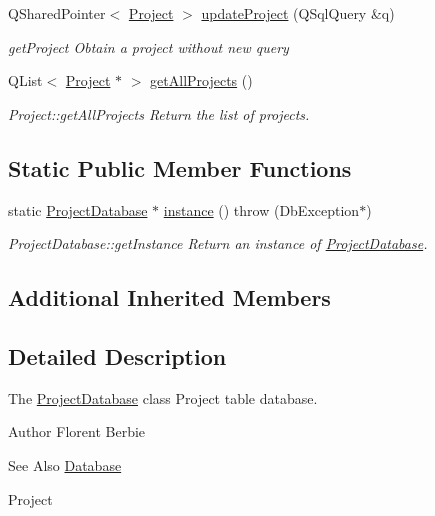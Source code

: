 \begin{DoxyCompactItemize}
Q\-Shared\-Pointer$<$ \hyperlink{classModels_1_1Project}{Project} $>$ \hyperlink{classDatabases_1_1ProjectDatabase_ab644aeb47d9666e8191cc9bc6ab93417}{update\-Project} (Q\-Sql\-Query \&q)
\begin{DoxyCompactList}\small\item\em get\-Project Obtain a project without new query \end{DoxyCompactList}\item 
Q\-List$<$ \hyperlink{classModels_1_1Project}{Project} $\ast$ $>$ \hyperlink{classDatabases_1_1ProjectDatabase_ac2532676aabcc8f304b2a3ddf4892205}{get\-All\-Projects} ()
\begin{DoxyCompactList}\small\item\em Project\-::get\-All\-Projects Return the list of projects. \end{DoxyCompactList}\end{DoxyCompactItemize}
\subsection*{Static Public Member Functions}
\begin{DoxyCompactItemize}
\item 
static \hyperlink{classDatabases_1_1ProjectDatabase}{Project\-Database} $\ast$ \hyperlink{classDatabases_1_1ProjectDatabase_a75cf81b8d073addcf43a313483dafe65}{instance} ()  throw (\-Db\-Exception$\ast$)
\begin{DoxyCompactList}\small\item\em Project\-Database\-::get\-Instance Return an instance of \hyperlink{classDatabases_1_1ProjectDatabase}{Project\-Database}. \end{DoxyCompactList}\end{DoxyCompactItemize}
\subsection*{Additional Inherited Members}


\subsection{Detailed Description}
The \hyperlink{classDatabases_1_1ProjectDatabase}{Project\-Database} class Project table database. 

\begin{DoxyAuthor}{Author}
Florent Berbie 
\end{DoxyAuthor}
\begin{DoxySeeAlso}{See Also}
\hyperlink{classDatabases_1_1Database}{Database} 

Project 
\end{DoxySeeAlso}


